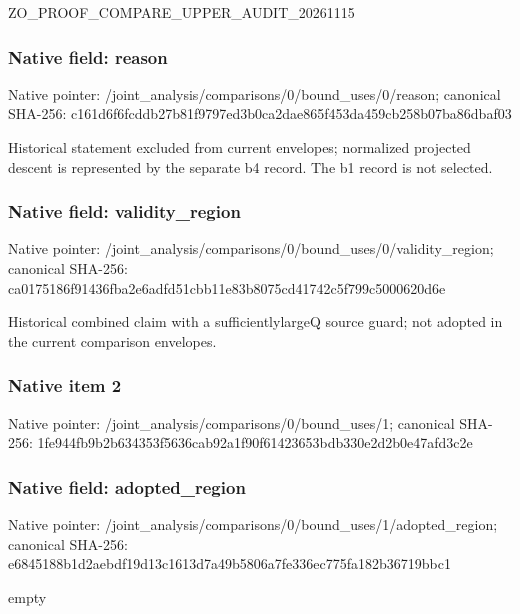 \documentclass[10pt,a4paper]{article}
\begin{document}
ZO\_PROOF\_COMPARE\_UPPER\_AUDIT\_20261115


\subsubsection{Native field: reason}


Native pointer: /joint\_analysis/comparis\allowbreak{}ons/0/bound\_uses/0/reaso\allowbreak{}n; canonical SHA-256: c161d6f6fcddb27b81f9797e\allowbreak{}d3b0ca2dae865f453da459cb\allowbreak{}258b07ba86dbaf03


Historical statement excluded from current envelopes; normalized projected descent is represented by the separate b4 record. The b1 record is not selected.


\subsubsection{Native field: validity\_region}


Native pointer: /joint\_analysis/comparis\allowbreak{}ons/0/bound\_uses/0/valid\allowbreak{}ity\_region; canonical SHA-256: ca0175186f91436fba2e6adf\allowbreak{}d51cbb11e83b8075cd41742c\allowbreak{}5f799c5000620d6e


Historical combined claim with a sufficientlylargeQ source guard; not adopted in the current comparison envelopes.


\subsubsection{Native item 2}


Native pointer: /joint\_analysis/comparis\allowbreak{}ons/0/bound\_uses/1; canonical SHA-256: 1fe944fb9b2b634353f5636c\allowbreak{}ab92a1f90f61423653bdb330\allowbreak{}e2d2b0e47afd3c2e



\subsubsection{Native field: adopted\_region}


Native pointer: /joint\_analysis/comparis\allowbreak{}ons/0/bound\_uses/1/adopt\allowbreak{}ed\_region; canonical SHA-256: e6845188b1d2aebdf19d13c1\allowbreak{}613d7a49b5806a7fe336ec77\allowbreak{}5fa182b36719bbc1


empty
\end{document}
